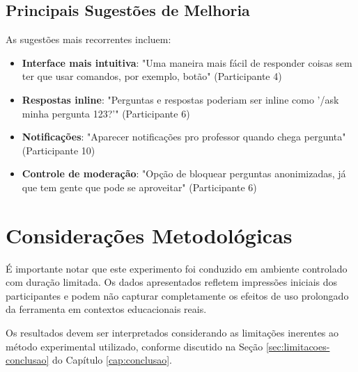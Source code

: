 \subsection{Principais Sugestões de Melhoria}
\label{subsec:sugestoes-melhoria}

As sugestões mais recorrentes incluem:

\begin{itemize}
\item \textbf{Interface mais intuitiva}: "Uma maneira mais fácil de responder
coisas sem ter que usar comandos, por exemplo, botão" (Participante 4)
\item \textbf{Respostas inline}: "Perguntas e respostas poderiam ser inline
como '/ask minha pergunta 123?'" (Participante 6)
\item \textbf{Notificações}: "Aparecer notificações pro professor quando chega
pergunta" (Participante 10)
\item \textbf{Controle de moderação}: "Opção de bloquear perguntas anonimizadas,
já que tem gente que pode se aproveitar" (Participante 6)
\end{itemize}

\section{Considerações Metodológicas}
\label{sec:consideracoes-metodologicas}

É importante notar que este experimento foi conduzido em ambiente controlado
com duração limitada. Os dados apresentados refletem impressões iniciais dos
participantes e podem não capturar completamente os efeitos de uso prolongado
da ferramenta em contextos educacionais reais.

Os resultados devem ser interpretados considerando as limitações inerentes ao
método experimental utilizado, conforme discutido na Seção
\ref{sec:limitacoes-conclusao} do Capítulo \ref{cap:conclusao}.
